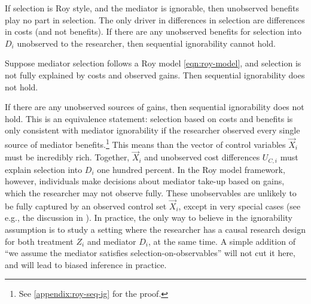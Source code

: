 If selection is Roy style, and the mediator is ignorable, then unobserved benefits play no part in selection.
The only driver in differences in selection are differences in costs (and not benefits).
If there are any unobserved benefits for selection into $D_i$ unobserved to the researcher, then sequential ignorability cannot hold.
\begin{definition}
    \label{def:roy-seq-ig}
    Suppose mediator selection follows a Roy model \eqref{eqn:roy-model}, and selection is not fully explained by costs and observed gains.
    Then sequential ignorability does not hold.
\end{definition}
If there are any unobserved sources of gains, then sequential ignorability does not hold.
This is an equivalence statement: selection based on costs and benefits is only consistent with mediator ignorability if the researcher observed every single source of mediator benefits.\footnote{
    See \autoref{appendix:roy-seq-ig} for the proof.
}
This means than the vector of control variables $\vec X_i$ must be incredibly rich.
Together, $\vec X_i$ and unobserved cost differences $U_{C,i}$ must explain selection into $D_i$ one hundred percent.
In the Roy model framework, however, individuals make decisions about mediator take-up based on gains, which the researcher may not observe fully. 
These unobservables are unlikely to be fully captured by an observed control set $\vec X_i$, except in very special cases (see e.g., the discussion in \citealt{angrist2009mostly,angrist2022empirical}).
In practice, the only way to believe in the ignorability assumption is to study a setting where the researcher has a causal research design for both treatment $Z_i$ and mediator $D_i$, at the same time.
A simple addition of ``we assume the mediator satisfies selection-on-observables'' will not cut it here, and will lead to biased inference in practice.

% 
% 
% 
% 